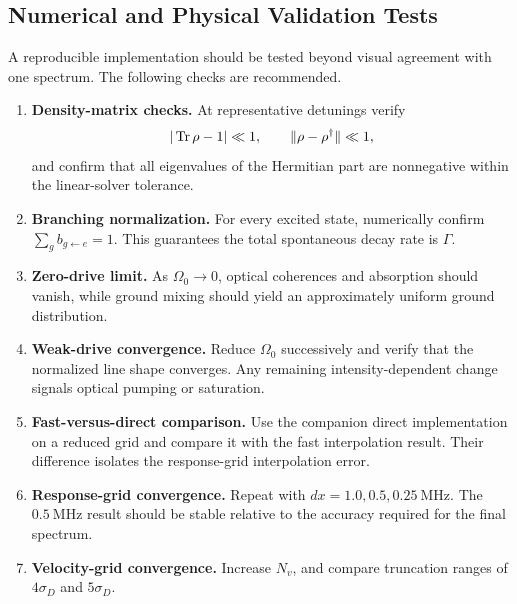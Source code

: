 \subsection{Numerical and Physical Validation Tests}
\label{subsec:dm_validation}

A reproducible implementation should be tested beyond visual agreement with
one spectrum.  The following checks are recommended.

\begin{enumerate}[label=\arabic*.]
\item \textbf{Density-matrix checks.}
At representative detunings verify
\begin{equation}
|\operatorname{Tr}\rho-1|\ll1,\qquad
\|\rho-\rho^\dagger\|\ll1,
\end{equation}
and confirm that all eigenvalues of the Hermitian part are nonnegative within
the linear-solver tolerance.

\item \textbf{Branching normalization.}
For every excited state, numerically confirm
\(\sum_g b_{g\leftarrow e}=1\).  This guarantees the total spontaneous decay
rate is \(\Gamma\).

\item \textbf{Zero-drive limit.}
As \(\Omega_0\rightarrow0\), optical coherences and absorption should vanish,
while ground mixing should yield an approximately uniform ground
distribution.

\item \textbf{Weak-drive convergence.}
Reduce \(\Omega_0\) successively and verify that the normalized line shape
converges.  Any remaining intensity-dependent change signals optical pumping
or saturation.

\item \textbf{Fast-versus-direct comparison.}
Use the companion direct implementation on a reduced grid and compare it with
the fast interpolation result.  Their difference isolates the response-grid
interpolation error.

\item \textbf{Response-grid convergence.}
Repeat with \(dx=1.0,0.5,0.25~\mathrm{MHz}\).  The \(0.5~\mathrm{MHz}\) result
should be stable relative to the accuracy required for the final spectrum.

\item \textbf{Velocity-grid convergence.}
Increase \(N_v\), and compare truncation ranges of \(4\sigma_D\) and
\(5\sigma_D\).


\end{enumerate}
